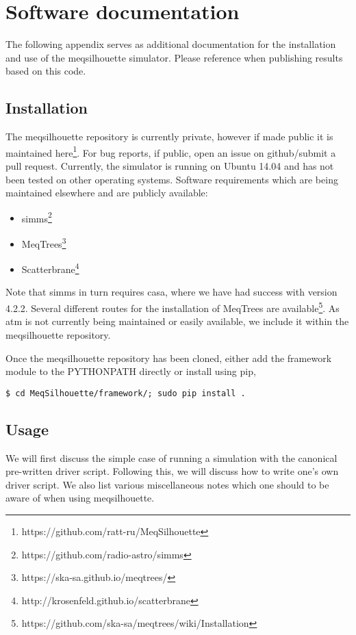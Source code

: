 \chapter{Software documentation}
The following appendix serves as additional documentation for the installation and use of the {\sc meqsilhouette} simulator. Please reference \citep{Blecher_2016} when publishing results based on this code.

\section{Installation}

The {\sc meqsilhouette} repository is currently private, however if made public it is maintained here\footnote{https://github.com/ratt-ru/MeqSilhouette}. For bug reports, if public, open an issue on github/submit a pull request. Currently, the simulator is running on {\sc Ubuntu 14.04} and has not been tested on other operating systems. Software requirements which are being maintained elsewhere and are publicly available: 
\begin{itemize}
 \item {\sc simms}\footnote{https://github.com/radio-astro/simms}
 \item {\sc MeqTrees}\footnote{https://ska-sa.github.io/meqtrees/} 
 \item {\sc Scatterbrane}\footnote{http://krosenfeld.github.io/scatterbrane}
\end{itemize}

Note that {\sc simms} in turn requires {\sc casa}, where we have had success with version 4.2.2. Several different routes for the installation of {\sc MeqTrees} are available\footnote{https://github.com/ska-sa/meqtrees/wiki/Installation}. As {\sc atm} is not currently being maintained or easily available, we include it within the {\sc meqsilhouette} repository. 


Once the {\sc meqsilhouette} repository has been cloned, either add the framework module to the PYTHONPATH directly or install using pip,
\begin{verbatim}
$ cd MeqSilhouette/framework/; sudo pip install .
\end{verbatim}
\section{Usage}

We will first discuss the simple case of running a simulation with the canonical pre-written driver script. Following this, we will discuss how to write one's own driver script. We also list various miscellaneous notes which one should to be aware of when using {\sc meqsilhouette}.
